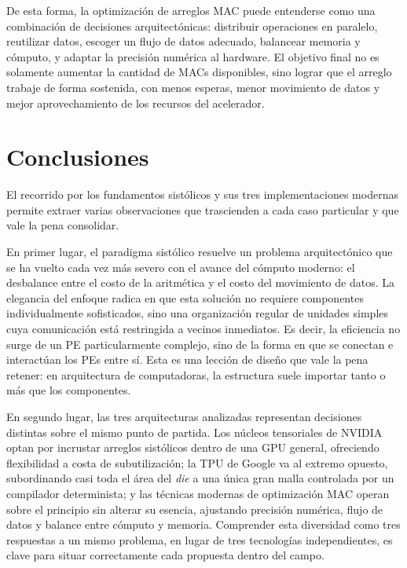 \documentclass[conference]{IEEEtran}
\begin{document}
De esta forma, la optimización de arreglos MAC puede entenderse como una combinación de decisiones arquitectónicas: distribuir operaciones en paralelo, reutilizar datos, escoger un flujo de datos adecuado, balancear memoria y cómputo, y adaptar la precisión numérica al hardware. El objetivo final no es solamente aumentar la cantidad de MACs disponibles, sino lograr que el arreglo trabaje de forma sostenida, con menos esperas, menor movimiento de datos y mejor aprovechamiento de los recursos del acelerador.

\section{Conclusiones}

El recorrido por los fundamentos sistólicos y sus tres implementaciones modernas permite extraer varias observaciones que trascienden a cada caso particular y que vale la pena consolidar.

En primer lugar, el paradigma sistólico resuelve un problema arquitectónico que se ha vuelto cada vez más severo con el avance del cómputo moderno: el desbalance entre el costo de la aritmética y el costo del movimiento de datos. La elegancia del enfoque radica en que esta solución no requiere componentes individualmente sofisticados, sino una organización regular de unidades simples cuya comunicación está restringida a vecinos inmediatos. Es decir, la eficiencia no surge de un PE particularmente complejo, sino de la forma en que se conectan e interactúan los PEs entre sí. Esta es una lección de diseño que vale la pena retener: en arquitectura de computadoras, la estructura suele importar tanto o más que los componentes.

En segundo lugar, las tres arquitecturas analizadas representan decisiones distintas sobre el mismo punto de partida. Los núcleos tensoriales de NVIDIA optan por incrustar arreglos sistólicos dentro de una GPU general, ofreciendo flexibilidad a costa de subutilización; la TPU de Google va al extremo opuesto, subordinando casi toda el área del \textit{die} a una única gran malla controlada por un compilador determinista; y las técnicas modernas de optimización MAC operan sobre el principio sin alterar su esencia, ajustando precisión numérica, flujo de datos y balance entre cómputo y memoria. Comprender esta diversidad como tres respuestas a un mismo problema, en lugar de tres tecnologías independientes, es clave para situar correctamente cada propuesta dentro del campo.
\end{document}
